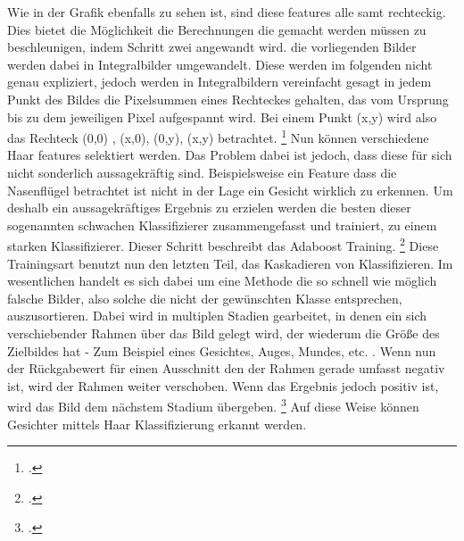 \documentclass[12pt, a4paper]{scrbook}
\begin{document}
Wie in der Grafik ebenfalls zu sehen ist, sind diese features alle samt rechteckig. Dies bietet die Möglichkeit die Berechnungen die gemacht werden müssen zu beschleunigen, indem Schritt zwei angewandt wird. die vorliegenden Bilder werden dabei in Integralbilder umgewandelt.  Diese werden im folgenden nicht genau expliziert, jedoch werden in Integralbildern vereinfacht gesagt in jedem Punkt des Bildes die Pixelsummen eines Rechteckes gehalten, das vom Ursprung bis zu dem jeweiligen Pixel aufgespannt wird. Bei einem Punkt (x,y) wird also das Rechteck (0,0) , (x,0), (0,y), (x,y) betrachtet.
\footcite[Vgl.][]{integral}
Nun können verschiedene Haar features selektiert werden. Das Problem dabei ist jedoch, dass diese für sich nicht sonderlich aussagekräftig sind. Beispielsweise ein Feature dass die Nasenflügel betrachtet ist nicht in der Lage ein Gesicht wirklich zu erkennen. Um deshalb ein aussagekräftiges Ergebnis zu erzielen werden die besten dieser sogenannten schwachen Klassifizierer zusammengefasst und trainiert,  zu einem starken Klassifizierer. Dieser Schritt beschreibt das Adaboost Training.
\footcite[Vgl.][]{willberger}
Diese Trainingsart benutzt nun den letzten Teil, das Kaskadieren von Klassifizieren. Im wesentlichen handelt es sich dabei um eine Methode die so schnell wie möglich falsche Bilder, also solche die nicht der gewünschten Klasse entsprechen, auszusortieren. Dabei wird in multiplen Stadien gearbeitet, in denen	 ein sich verschiebender Rahmen über das Bild gelegt wird, der wiederum die Größe des Zielbildes hat - Zum Beispiel eines Gesichtes, Auges, Mundes, etc. . Wenn nun der Rückgabewert für einen Ausschnitt den der Rahmen gerade umfasst negativ ist, wird der Rahmen weiter verschoben. Wenn das Ergebnis jedoch positiv ist, wird das Bild dem nächstem Stadium übergeben. 
\footcite[Vgl.][]{willberger}
Auf diese Weise können Gesichter mittels Haar Klassifizierung erkannt werden.
\end{document}
